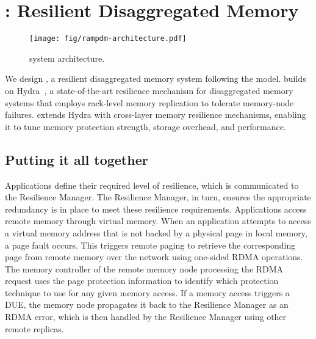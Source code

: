 \section{\rampdm: Resilient Disaggregated Memory}

\begin{figure}[!t]
\centering
\texttt{[image: fig/rampdm-architecture.pdf]}
\caption{\rampdm system architecture.}
\label{fig:rampdm-architecture}
\end{figure}

We design \rampdm, a resilient disaggregated memory system following the \ramp model.
\rampdm builds on Hydra~\cite{lee:hydra:fast:2022}, a state-of-the-art resilience mechanism for disaggregated memory systems that employs rack-level memory replication to tolerate memory-node failures. 
\rampdm extends Hydra with cross-layer memory resilience mechanisms, enabling it to tune memory protection strength, storage overhead, and performance. 







\subsection{Putting it all together}

Applications define their required level of resilience, which is communicated to the Resilience Manager. The Resilience Manager, in turn, ensures the appropriate redundancy is in place to meet these resilience requirements.
Applications access remote memory through virtual memory. 
When an application attempts to access a virtual memory address that is not backed by a physical page in local memory, a page fault occurs. This triggers remote paging to retrieve the corresponding page from remote memory over the network using one-sided RDMA operations. 
The memory controller of the remote memory node processing the RDMA request uses the page protection information to identify which protection technique to use for any given memory access.
If a memory access triggers a DUE, the memory node propagates it back to the Resilience Manager as an RDMA error, which is then handled by the Resilience Manager using other remote replicas.